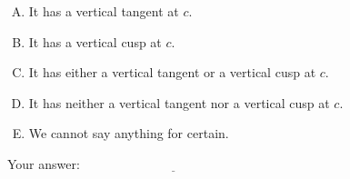 \documentclass[10pt]{amsart}
\begin{document}
\begin{enumerate}
  \begin{enumerate}[(A)]
  \item It has a vertical tangent at $c$.
  \item It has a vertical cusp at $c$.
  \item It has either a vertical tangent or a vertical cusp at $c$.
  \item It has neither a vertical tangent nor a vertical cusp at $c$.
  \item We cannot say anything for certain.
  \end{enumerate}

  \vspace{0.1in}
  Your answer: $\underline{\qquad\qquad\qquad\qquad\qquad\qquad\qquad}$
  \vspace{0.6in}

\end{enumerate}
\end{document}
